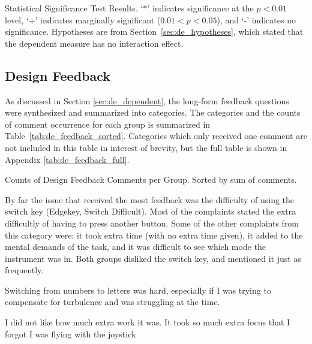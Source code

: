 \begin{table}
    \centering
    \caption{Statistical Significance Test Results. `$*$' indicates significance at the $p<0.01$ level, `+' indicates marginally significant ($0.01<p<0.05$), and `-' indicates no significance. Hypotheses are from Section~\ref{sec:de_hypotheses}, which stated that the dependent measure has no interaction effect.}
    \label{tab:de_anova}
\end{table}

\subsection{Design Feedback}

As discussed in Section \autoref{sec:de_dependent}, the long-form feedback questions were synthesized and summarized into categories.
The categories and the counts of comment occurrence for each group is summarized in Table~\ref{tab:de_feedback_sorted}.
Categories which only received one comment are not included in this table in interest of brevity, but the full table is shown in Appendix \ref{tab:de_feedback_full}.

\begin{table}
    \centering
    \caption{Counts of Design Feedback Comments per Group. Sorted by sum of comments.}
    \label{tab:de_feedback_sorted}
\end{table}

By far the issue that received the most feedback was the difficulty of using the switch key (Edgekey, Switch Difficult).
Most of the complaints stated the extra difficultly of having to press another button.
Some of the other complaints from this category were: it took extra time (with no extra time given), it added to the mental demands of the task, and it was difficult to see which mode the instrument was in.
Both groups disliked the switch key, and mentioned it just as frequently.
\begin{displayquote}[TS Subject]
    Switching from numbers to letters was hard, especially if I was trying to compensate for turbulence and was struggling at the time.
\end{displayquote}
\begin{displayquote}[VR Subject]
    I did not like how much extra work it was. It took so much extra focus that I forgot I was flying with the joystick
\end{displayquote}

